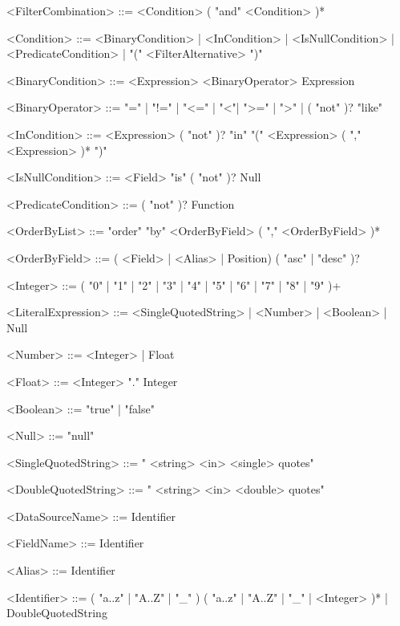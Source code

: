 \begin{grammar}
    <FilterCombination> ::= <Condition> ( "and" <Condition> )*

    <Condition> ::= <BinaryCondition> | <InCondition> | <IsNullCondition> | <PredicateCondition> | "(" <FilterAlternative> ")"

    <BinaryCondition> ::= <Expression>  <BinaryOperator> Expression

    <BinaryOperator> ::= "=" | "!=" | "<=" | "<"| ">=" | ">" | ( "not" )? "like"

    <InCondition> ::= <Expression> ( "not" )? "in" "(" <Expression> ( "," <Expression> )* ")"

    <IsNullCondition> ::= <Field> "is" ( "not" )? Null

    <PredicateCondition> ::= ( "not" )? Function

    <OrderByList> ::= "order" "by" <OrderByField> ( "," <OrderByField> )*

    <OrderByField> ::= ( <Field> | <Alias> | Position) ( "asc" | "desc" )?

    <Integer> ::= ( "0" | "1" | "2" | "3" | "4" | "5" | "6" | "7" | "8" | "9" )+

    <LiteralExpression> ::= <SingleQuotedString> | <Number> | <Boolean> | Null

    <Number> ::= <Integer> | Float

    <Float> ::= <Integer> "." Integer

    <Boolean> ::= "true" | "false"

    <Null> ::= "null"

    <SingleQuotedString> ::= " <string>  <in>  <single> quotes"

    <DoubleQuotedString> ::= " <string>  <in>  <double> quotes"

    <DataSourceName> ::= Identifier

    <FieldName> ::= Identifier

    <Alias> ::= Identifier

    <Identifier> ::= ( "a..z" | "A..Z" | "_" ) ( "a..z" | "A..Z" | "_" | <Integer> )* | DoubleQuotedString

\end{grammar}
